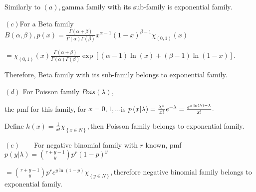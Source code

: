 \documentclass{article}
\begin{document}
Similarly to $\left( a\right) ,$gamma family with its sub-family is
exponential family.

$\left( c\right) $For a Beta family $B\left( \alpha ,\beta \right) ,p\left(
x\right) =\frac{\Gamma \left( \alpha +\beta \right) }{\Gamma \left( \alpha
\right) \Gamma \left( \beta \right) }x^{\alpha -1}\left( 1-x\right) ^{\beta
-1}\chi _{(0,1)}(x)$

$=\chi _{(0,1)}(x)\frac{\Gamma \left( \alpha +\beta \right) }{\Gamma \left(
\alpha \right) \Gamma \left( \beta \right) }\exp \left[ \left( \alpha
-1\right) \ln \left( x\right) +\left( \beta -1\right) \ln \left( 1-x\right) %
\right] .$

Therefore, Beta family with its sub-family belongs to exponential family.

$\left( d\right) $ For Poisson family $Pois\left( \lambda \right) ,$

the pmf for this family, for $x=0,1,...$is $p\left( x|\lambda \right) =\frac{%
\lambda ^{x}}{x!}e^{-\lambda }=\frac{e^{x\ln \left( \lambda \right) -\lambda
}}{x!}.$

Define $h\left( x\right) =\frac{1}{x!}\chi _{\left\{ x\in N\right\} },$then
Poisson family belongs to exponential family.

$\left( e\right) \qquad $For negative binomial family with $r$ known, pmf $%
p\left( y|\lambda \right) =\binom{r+y-1}{y}p^{r}\left( 1-p\right) ^{y}$

$=\binom{r+y-1}{y}p^{r}e^{y\ln \left( 1-p\right) }\chi _{\left\{ y\in
N\right\} },$therefore negative binomial family belongs to exponential
family.

\bigskip
\end{document}
